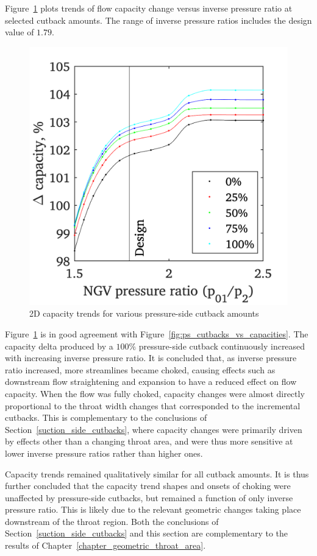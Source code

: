 \documentclass[a4paper, 11pt, oneside]{report}
\begin{document}
Figure~\ref{fig:ps_cutbacks_capacities_trends} plots trends of flow capacity change versus inverse pressure ratio at selected cutback amounts. The range of inverse pressure ratios includes the design value of $1.79$.

\begin{figure}[H]
	\centering
	\includegraphics[width=.45\textwidth]{figs/ps_cutbacks_capacities_trends.png}
	\caption{2D capacity trends for various pressure-side cutback amounts}
    \label{fig:ps_cutbacks_capacities_trends}
\end{figure}

Figure~\ref{fig:ps_cutbacks_capacities_trends} is in good agreement with Figure~\ref{fig:ps_cutbacks_vs_capacities}. The capacity delta produced by a $100\%$ pressure-side cutback continuously increased with increasing inverse pressure ratio. It is concluded that, as inverse pressure ratio increased, more streamlines became choked, causing effects such as downstream flow straightening and expansion to have a reduced effect on flow capacity. When the flow was fully choked, capacity changes were almost directly proportional to the throat width changes that corresponded to the incremental cutbacks. This is complementary to the conclusions of Section~\ref{suction_side_cutbacks}, where capacity changes were primarily driven by effects other than a changing throat area, and were thus more sensitive at lower inverse pressure ratios rather than higher ones. 

Capacity trends remained qualitatively similar for all cutback amounts. It is thus further concluded that the capacity trend shapes and onsets of choking were unaffected by pressure-side cutbacks, but remained a function of only inverse pressure ratio. This is likely due to the relevant geometric changes taking place downstream of the throat region. Both the conclusions of Section~\ref{suction_side_cutbacks} and this section are complementary to the results of Chapter~\ref{chapter_geometric_throat_area}.
\end{document}
